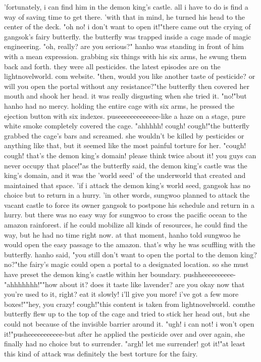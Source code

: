 'fortunately, i can find him in the demon king's castle.
 all i have to do is find a way of saving time to get there.
'with that in mind, he turned his head to the center of the deck.
"oh no! i don't want to open it!"there came out the crying of gangsok's fairy butterfly.
 the butterfly was trapped inside a cage made of magic engineering.
 "oh, really? are you serious?" hanho was standing in front of him with a mean expression.
 grabbing six things with his six arms, he swung them back and forth.
 they were all pesticides.
the latest episodes are on the lightnovelworld.
com website.
"then, would you like another taste of pesticide? or will you open the portal without any resistance?"the butterfly then covered her mouth and shook her head.
 it was really disgusting when she tried it.
 "no!"but hanho had no mercy.
 holding the entire cage with six arms, he pressed the ejection button with six indexes.
puseeeeeeeeeeeee-like a haze on a stage, pure white smoke completely covered the cage.
"ahhhhh! cough! cough!"the butterfly grabbed the cage's bars and screamed.
 she wouldn't be killed by pesticides or anything like that, but it seemed like the most painful torture for her.
"cough! cough! that's the demon king's domain! please think twice about it! you guys can never occupy that place!"as the butterfly said, the demon king's castle was the king's domain, and it was the 'world seed' of the underworld that created and maintained that space.
'if i attack the demon king's world seed, gangsok has no choice but to return in a hurry.
'in other words, sungwoo planned to attack the vacant castle to force its owner gangsok to postpone his schedule and return in a hurry.
but there was no easy way for sungwoo to cross the pacific ocean to the amazon rainforest.
 if he could mobilize all kinds of resources, he could find the way, but he had no time right now.
 at that moment, hanho told sungwoo he would open the easy passage to the amazon.
 that's why he was scuffling with the butterfly.
hanho said, "you still don't want to open the portal to the demon king? no?"the fairy's magic could open a portal to a designated location.
 so she must have preset the demon king's castle within her boundary.
pushheeeeeeeeee-"ahhhhhhh!""how about it? does it taste like lavender? are you okay now that you're used to it, right? eat it slowly! i'll give you more! i've got a few more boxes!""hey, you crazy! cough!"this content is taken from lightnovelworld.
comthe butterfly flew up to the top of the cage and tried to stick her head out, but she could not because of the invisible barrier around it.
"ugh! i can not! i won't open it!"pusheeeeeeeeeee-but after he applied the pesticide over and over again, she finally had no choice but to surrender.
"argh! let me surrender! got it!"at least this kind of attack was definitely the best torture for the fairy.
 

